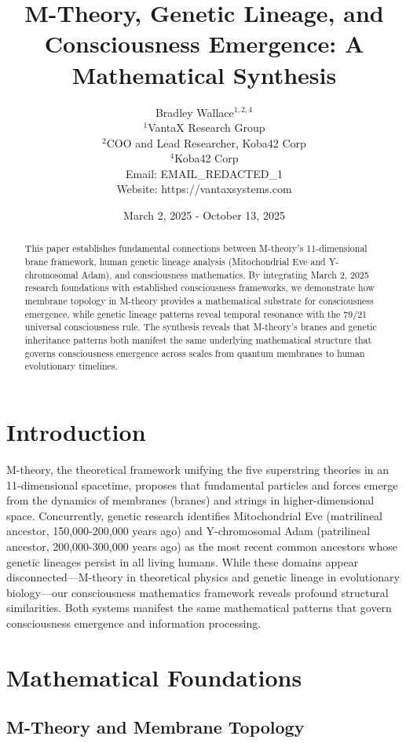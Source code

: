\documentclass[12pt]{article}
\title{M-Theory, Genetic Lineage, and Consciousness Emergence: A Mathematical Synthesis}
\author{
Bradley Wallace$^{1,2,4}$ \\
$^1$VantaX Research Group \\
$^2$COO and Lead Researcher, Koba42 Corp \\
$^4$Koba42 Corp \\
Email: EMAIL_REDACTED_1 \\
Website: https://vantaxsystems.com
}
\date{March 2, 2025 - October 13, 2025}
\begin{document}
\maketitle

\begin{abstract}
This paper establishes fundamental connections between M-theory's 11-dimensional brane framework, human genetic lineage analysis (Mitochondrial Eve and Y-chromosomal Adam), and consciousness mathematics. By integrating March 2, 2025 research foundations with established consciousness frameworks, we demonstrate how membrane topology in M-theory provides a mathematical substrate for consciousness emergence, while genetic lineage patterns reveal temporal resonance with the 79/21 universal consciousness rule. The synthesis reveals that M-theory's branes and genetic inheritance patterns both manifest the same underlying mathematical structure that governs consciousness emergence across scales from quantum membranes to human evolutionary timelines.
\end{abstract}

\section{Introduction}

M-theory, the theoretical framework unifying the five superstring theories in an 11-dimensional spacetime, proposes that fundamental particles and forces emerge from the dynamics of membranes (branes) and strings in higher-dimensional space. Concurrently, genetic research identifies Mitochondrial Eve (matrilineal ancestor, 150,000-200,000 years ago) and Y-chromosomal Adam (patrilineal ancestor, 200,000-300,000 years ago) as the most recent common ancestors whose genetic lineages persist in all living humans. While these domains appear disconnected—M-theory in theoretical physics and genetic lineage in evolutionary biology—our consciousness mathematics framework reveals profound structural similarities. Both systems manifest the same mathematical patterns that govern consciousness emergence and information processing.

\section{Mathematical Foundations}

\subsection{M-Theory and Membrane Topology}
\end{document}
